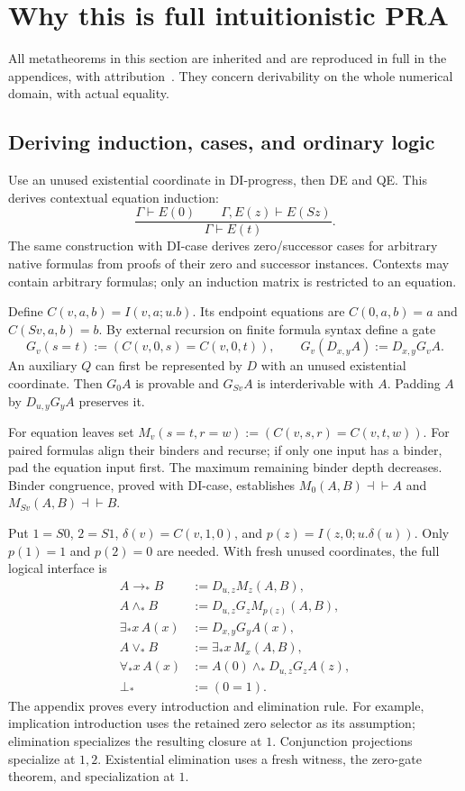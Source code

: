 \documentclass[11pt,letterpaper]{article}
\theoremstyle{definition}\newtheorem{definition}[theorem]{Definition}
\theoremstyle{remark}\newtheorem{remark}[theorem]{Remark}
\begin{document}
\section{Why this is full intuitionistic PRA}
\label{sec:ipra-equivalence}

All metatheorems in this section are inherited and are reproduced in full
in the appendices, with attribution~\cite{choice,flat}. They concern
derivability on the whole numerical domain, with actual equality.

\subsection{Deriving induction, cases, and ordinary logic}

Use an unused existential coordinate in DI-progress, then DE and QE.
This derives contextual equation induction:
\[
 \frac{\Gamma\vdash E(0)\qquad\Gamma,E(z)\vdash E(Sz)}
      {\Gamma\vdash E(t)}.
\]
The same construction with DI-case derives zero/successor cases for
arbitrary native formulas from proofs of their zero and successor
instances. Contexts may contain arbitrary formulas; only an induction
matrix is restricted to an equation.

Define $C(v,a,b)=I(v,a;u.b)$. Its endpoint equations are
$C(0,a,b)=a$ and $C(Sv,a,b)=b$. By external recursion on finite formula
syntax define a gate
\[
 G_v(s=t):=(C(v,0,s)=C(v,0,t)),\qquad
 G_v(D_{x,y}A):=D_{x,y}G_vA.
\]
An auxiliary $Q$ can first be represented by $D$ with an unused existential
coordinate. Then $G_0A$ is provable and $G_{Sv}A$ is interderivable with
$A$. Padding $A$ by $D_{u,y}G_yA$ preserves it.

For equation leaves set
$M_v(s=t,r=w):=(C(v,s,r)=C(v,t,w))$.
For paired formulas align their binders and recurse; if only one input
has a binder, pad the equation input first. The maximum remaining binder
depth decreases. Binder congruence, proved with DI-case, establishes
$M_0(A,B)\dashv\vdash A$ and $M_{Sv}(A,B)\dashv\vdash B$.

Put $1=S0$, $2=S1$, $\delta(v)=C(v,1,0)$, and
$p(z)=I(z,0;u.\delta(u))$. Only $p(1)=1$ and $p(2)=0$ are needed.
With fresh unused coordinates, the full logical interface is
\begin{align*}
 A\to_*B&:=D_{u,z}M_z(A,B),\\
 A\wedge_*B&:=D_{u,z}G_zM_{p(z)}(A,B),\\
 \exists_*x\,A(x)&:=D_{x,y}G_yA(x),\\
 A\vee_*B&:=\exists_*x\,M_x(A,B),\\
 \forall_*x\,A(x)&:=A(0)\wedge_*D_{u,z}G_zA(z),\\
 \bot_*&:=(0=1).
\end{align*}
The appendix proves every introduction and elimination rule. For example,
implication introduction uses the retained zero selector as its assumption;
elimination specializes the resulting closure at $1$. Conjunction
projections specialize at $1,2$. Existential elimination uses a fresh
witness, the zero-gate theorem, and specialization at $1$.
\end{document}
